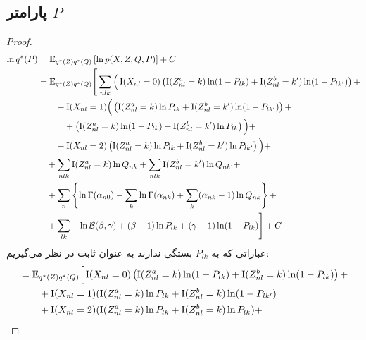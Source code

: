 \subsection{پارامتر
$P$}

\begin{proof}
\begin{align*}
\ln \StarProb{P} &= \Exp{\StarProb{Z} \StarProb{Q}}{\ln \TrueProb{X, Z, Q, P}} + C
\\ %
	&= \mathbb{E}_{\StarProb{Z} \StarProb{Q}} \Bigg[ \sum_{nlk} \Big( \Big.
		\Indic{X_{nl} = 0} \left( \Indic{Z_{nl}^a = k} \ln (1 - P_{lk})
				+ \Indic{Z_{nl}^b = k'} \ln (1 - P_{lk'}) \right) +												\nonumber \\
			& \qquad + \Indic{X_{nl} = 1} \Big(
				\left( \Indic{Z_{nl}^a=k} \ln P_{lk} + \Indic{Z_{nl}^b=k'} \ln (1 - P_{lk'}) \right) +			\nonumber \\
			& \qquad \quad + \left( \Indic{Z_{nl}^a=k} \ln (1 - P_{lk}) + \Indic{Z_{nl}^b=k'} \ln P_{lk} \right)
			\Big) +																								\nonumber \\
			& \qquad + \Indic{X_{nl} = 2} \left( \Indic{Z_{nl}^a = k} \ln P_{lk}
				+ \Indic{Z_{nl}^b = k'} \ln P_{lk'} \right)
	\Big. \Big) +
\nonumber \\ %
		& \quad + \sum_{nlk} \Indic{Z_{nl}^a = k} \ln Q_{nk}
			+ \sum_{nlk} \Indic{Z_{nl}^b = k'} \ln Q_{nk'} +
\nonumber \\ %
		& \quad + \sum_n \left\{
			\ln \GammaFunc{\alpha_{n0}}
			- \sum_{k} \ln \GammaFunc{\alpha_{nk}}
			+ \sum_{k} (\alpha_{nk} - 1) \ln Q_{nk}
		\right\} +
\nonumber \\ %
		& \quad + \sum_{lk} - \ln \BetaFunc{\beta}{\gamma}
		+ (\beta - 1) \ln P_{lk}
		+ (\gamma - 1) \ln (1 - P_{lk})
	\Bigg] + C
\end{align*}
عباراتی که به
$P_{lk}$
بستگی ندارند به عنوان ثابت در نظر می‌گیریم:
\begin{align*}
	&= \mathbb{E}_{\StarProb{Z} \StarProb{Q}} \Big[
		\Indic{X_{nl} = 0} \left( \Indic{Z_{nl}^a = k} \ln (1 - P_{lk}) + \Indic{Z_{nl}^b=k} \ln (1 - P_{lk}) \right) +			\nonumber \\
		& \qquad + \Indic{X_{nl}=1} (\Indic{Z_{nl}^a=k} \ln P_{lk} + \Indic{Z_{nl}^b=k} \ln (1 - P_{lk'})			\\
		& \qquad + \Indic{X_{nl}=2} (\Indic{Z_{nl}^a=k} \ln P_{lk} + \Indic{Z_{nl}^b=k} \ln P_{lk}) +				\\

\end{align*}
\end{proof}
